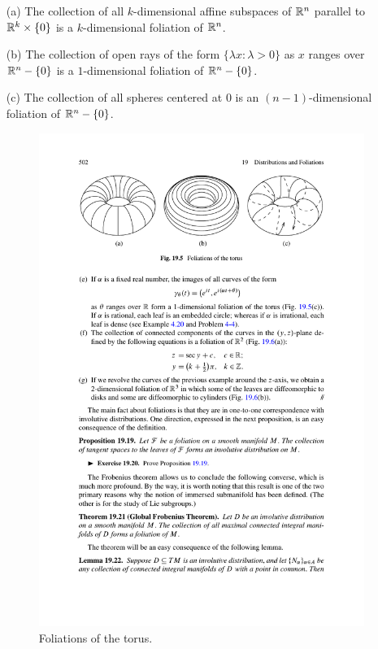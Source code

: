 \begin{example}
\mbox{}
\begin{itemize}
\item[(a)] The collection of all $k$-dimensional affine subspaces of $\mathbb{R}^n$ parallel to $\mathbb{R}^k\times\{0\}$ is a $k$-dimensional foliation of $\mathbb{R}^n$.
\item[(b)] The collection of open rays of the form $\{\lambda x:\lambda>0\}$ as $x$ ranges over $\mathbb{R}^n-\{0\}$ is a $1$-dimensional foliation of $\mathbb{R}^n-\{0\}$.
\item[(c)] The collection of all spheres centered at $0$ is an $(n-1)$-dimensional foliation of $\mathbb{R}^n-\{0\}$.
\begin{figure}[htbp]
\centering
\includegraphics{pictures/foliation-of-torus}
\caption{Foliations of the torus.}

\end{figure}
\end{itemize}
\end{example}
